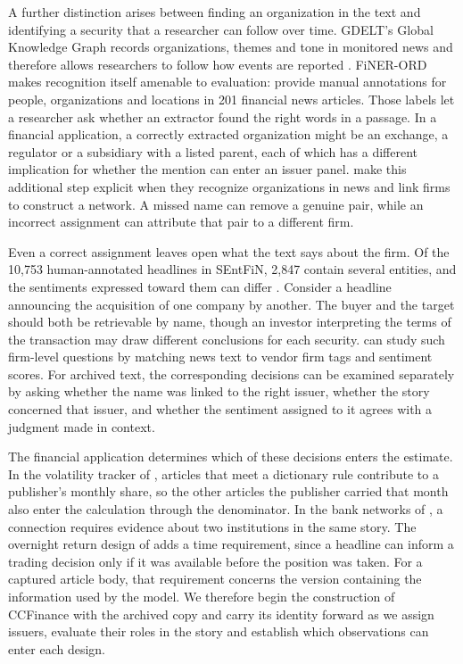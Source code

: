A further distinction arises between finding an organization in the
text and identifying a security that a researcher can follow over time.
GDELT's Global Knowledge Graph records organizations, themes and tone
in monitored news and therefore allows researchers to follow how events
are reported \citep{gdelt}. FiNER-ORD makes recognition itself amenable
to evaluation: \citet{shah2024} provide manual annotations for people,
organizations and locations in 201 financial news articles. Those labels
let a researcher ask whether an extractor found the right words in a
passage. In a financial application, a correctly extracted organization
might be an exchange, a regulator or a subsidiary with a listed parent,
each of which has a different implication for whether the mention can
enter an issuer panel. \citet{schwenkler2020} make this additional step
explicit when they recognize organizations in news and link firms to
construct a network. A missed name can remove a genuine pair, while an
incorrect assignment can attribute that pair to a different firm.

Even a correct assignment leaves open what the text says about the firm.
Of the 10,753 human-annotated headlines in SEntFiN, 2,847 contain several
entities, and the sentiments expressed toward them can differ
\citep{sinha2022sentfin}. Consider a headline announcing the acquisition
of one company by another. The buyer and the target should both be
retrievable by name, though an investor interpreting the terms of the
transaction may draw different conclusions for each security.
\citet{heston2017} can study such firm-level questions by matching news
text to vendor firm tags and sentiment scores. For archived text, the
corresponding decisions can be examined separately by asking whether
the name was linked to the right issuer, whether the story concerned
that issuer, and whether the sentiment assigned to it agrees with a
judgment made in context.

The financial application determines which of these decisions enters
the estimate. In the volatility tracker of \citet{baker2026}, articles
that meet a dictionary rule contribute to a publisher's monthly share,
so the other articles the publisher carried that month also enter the
calculation through the denominator. In the bank networks of
\citet{kazinnik2026}, a connection requires evidence about two
institutions in the same story. The overnight return design of
\citet{lopez2026} adds a time requirement, since a headline can inform
a trading decision only if it was available before the position was
taken. For a captured article body, that requirement concerns the
version containing the information used by the model. We therefore
begin the construction of CCFinance with the archived copy and carry
its identity forward as we assign issuers, evaluate their roles in
the story and establish which observations can enter each design.
